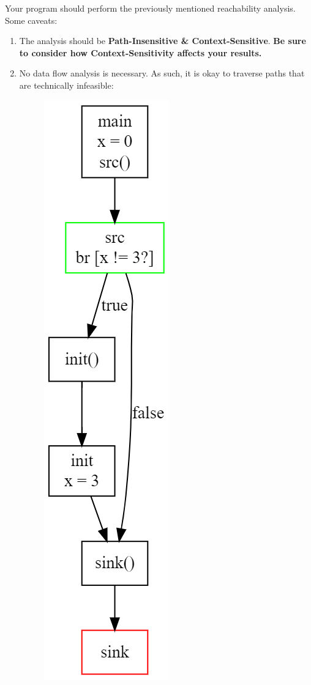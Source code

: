 \documentclass[12pt]{article}
\begin{document}
\filbreak
Your program should perform the previously mentioned reachability analysis.
Some caveats:
\begin{enumerate}
    \item The analysis should be \textbf{Path-Insensitive \& Context-Sensitive}. \textbf{Be sure to consider how Context-Sensitivity affects your results.} 
    
    \item No data flow analysis is necessary. As such, it is okay to traverse paths that are technically infeasible:
\begin{figure}[htpb]
    \centering
    \includegraphics[scale=0.45]{interprocedural.png}
    \label{case2}
\end{figure}


\end{enumerate}
\end{document}

